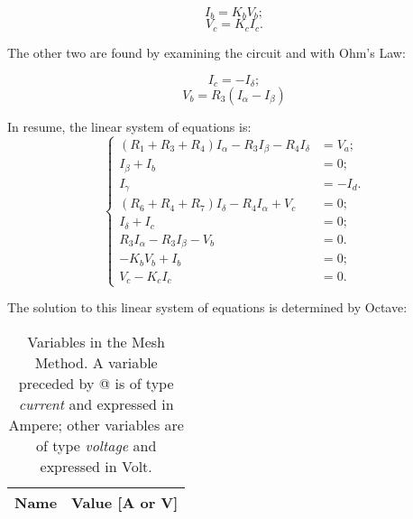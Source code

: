 \begin{equation}
  I_b = K_bV_b;
  \label{eq:Vb_Ib}
\end{equation}
\begin{equation}
  V_c = K_cI_c.
  \label{eq:Vc_Ic}
\end{equation}

The other two are found by examining the circuit and with Ohm's Law:

\begin{equation}
  I_c = - I_{\delta};
  \label{eq:MM_Ic}
\end{equation}
\begin{equation}
  V_b = R_3(I_{\alpha}-I_{\beta})
  \label{eq:MM_Vb}
\end{equation}

In resume, the linear system of equations is:
\begin{equation}
\begin{cases}
	(R_1+R_3+R_4)I_{\alpha} - R_3I_{\beta} - R_4I_{\delta} &= V_a;		\\
  	I_{\beta} + I_b &= 0;												\\
  	I_{\gamma} &= - I_d.												\\
  	(R_6+R_4+R_7)I_{\delta} - R_4I_{\alpha} + V_c &= 0;					\\
  	I_{\delta} + I_c &= 0; 												\\
  	R_3I_{\alpha} - R_3I_{\beta} - V_b &= 0.							\\
  	-K_bV_b + I_b &= 0;													\\
  	V_c - K_cI_c &= 0.
\end{cases}
\end{equation}

The solution to this linear system of equations is determined by Octave:
\begin{table}[h]
  \centering
  \begin{tabular}{|l|r|}
    \hline    
    {\bf Name} & {\bf Value [A or V]} \\ \hline
    
  \end{tabular}
  \caption{Variables in the Mesh Method. A variable preceded by @ is of type {\em current} and expressed in Ampere; other variables are of type {\em voltage} and expressed in Volt.}
  \label{tab:malhas}
\end{table}


